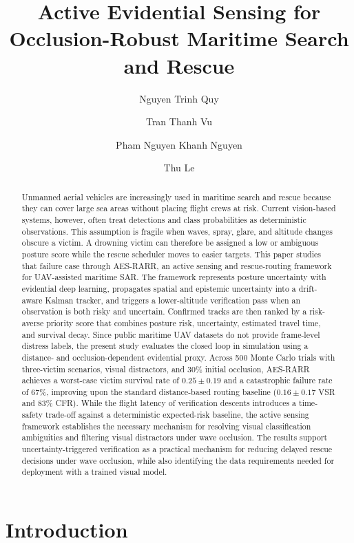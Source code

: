 \documentclass[runningheads]{llncs}
\title{Active Evidential Sensing for Occlusion-Robust Maritime Search and Rescue}
\author{Nguyen Trinh Quy\orcidID{0009-0004-8203-0736} \and Tran Thanh Vu\orcidID{0009-0009-2165-2861} \and Pham Nguyen Khanh Nguyen\orcidID{0009-0009-7619-4546} \and Thu Le\orcidID{0009-0008-3480-8311}}
\institute{FPT University HCM, Ho Chi Minh City, Vietnam\\
\email{\{nguyentrinhquy1411, tranthanhvu342006, nguyentvvn12\}@gmail.com}, \email{thulvm@fpt.edu.vn}}
\newcommand{\aes}{AES-RARR}
\begin{document}
\maketitle

\begin{abstract}
Unmanned aerial vehicles are increasingly used in maritime search and rescue because they can cover large sea areas without placing flight crews at risk. Current vision-based systems, however, often treat detections and class probabilities as deterministic observations. This assumption is fragile when waves, spray, glare, and altitude changes obscure a victim. A drowning victim can therefore be assigned a low or ambiguous posture score while the rescue scheduler moves to easier targets. This paper studies that failure case through \aes, an active sensing and rescue-routing framework for UAV-assisted maritime SAR. The framework represents posture uncertainty with evidential deep learning, propagates spatial and epistemic uncertainty into a drift-aware Kalman tracker, and triggers a lower-altitude verification pass when an observation is both risky and uncertain. Confirmed tracks are then ranked by a risk-averse priority score that combines posture risk, uncertainty, estimated travel time, and survival decay. Since public maritime UAV datasets do not provide frame-level distress labels, the present study evaluates the closed loop in simulation using a distance- and occlusion-dependent evidential proxy. Across 500 Monte Carlo trials with three-victim scenarios, visual distractors, and 30\% initial occlusion, \aes{} achieves a worst-case victim survival rate of $0.25 \pm 0.19$ and a catastrophic failure rate of 67\%, improving upon the standard distance-based routing baseline ($0.16 \pm 0.17$ VSR and 83\% CFR). While the flight latency of verification descents introduces a time-safety trade-off against a deterministic expected-risk baseline, the active sensing framework establishes the necessary mechanism for resolving visual classification ambiguities and filtering visual distractors under wave occlusion. The results support uncertainty-triggered verification as a practical mechanism for reducing delayed rescue decisions under wave occlusion, while also identifying the data requirements needed for deployment with a trained visual model.
\end{abstract}

\section{Introduction}
\end{document}
